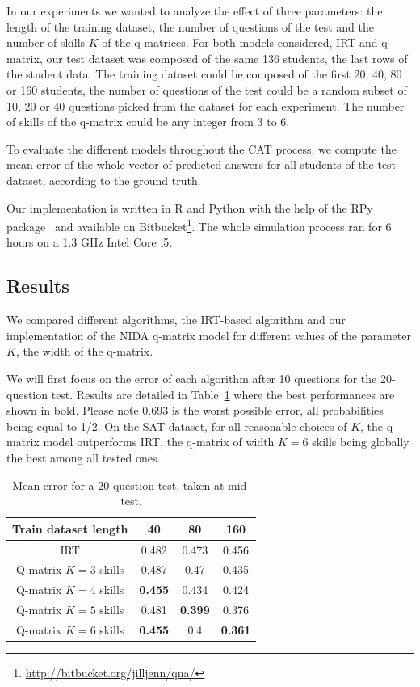 \documentclass{sig-alternate}
\begin{document}
In our experiments we wanted to analyze the effect of three parameters: the length of the training dataset, the number of questions of the test and the number of skills $K$ of the q-matrices. For both models considered, IRT and q-matrix, our test dataset was composed of the same 136 students, the last rows of the student data. The training dataset could be composed of the first 20, 40, 80 or 160 students, the number of questions of the test could be a random subset of 10, 20 or 40 questions picked from the dataset for each experiment. The number of skills of the q-matrix could be any integer from 3 to 6.

To evaluate the different models throughout the CAT process, we compute the mean error of the whole vector of predicted answers for all students of the test dataset, according to the ground truth.

Our implementation is written in R and Python with the help of the RPy package~\citep{Gautier2008} and available on Bitbucket\footnote{\url{http://bitbucket.org/jilljenn/qna/}}. The whole simulation process ran for 6 hours on a 1.3 GHz Intel Core i5.

\subsection{Results}

We compared different algorithms, the IRT-based algorithm and our implementation of the NIDA q-matrix model for different values of the parameter $K$, the width of the q-matrix.

We will first focus on the error of each algorithm after 10 questions for the 20-question test. Results are detailed in Table~\ref{tab:20q} where the best performances are shown in bold. Please note 0.693 is the worst possible error, all probabilities being equal to 1/2. On the SAT dataset, for all reasonable choices of $K$, the q-matrix model outperforms IRT, the q-matrix of width $K = 6$ skills being globally the best among all tested ones.

\begin{table}[H]
\centering\begin{tabular}{cccc}
Train dataset length & 40 & 80 & 160\\
\hline
IRT & 0.482 & 0.473 & 0.456\\
Q-matrix $K = 3$ skills & 0.487 & 0.47 & 0.435\\
Q-matrix $K = 4$ skills & \textbf{0.455} & 0.434 & 0.424\\
Q-matrix $K = 5$ skills & 0.481 & \textbf{0.399} & 0.376\\
Q-matrix $K = 6$ skills & \textbf{0.455} & 0.4 & \textbf{0.361}\\
\end{tabular}
\caption{Mean error for a 20-question test, taken at mid-test.}
\label{tab:20q}
\end{table}
\end{document}
